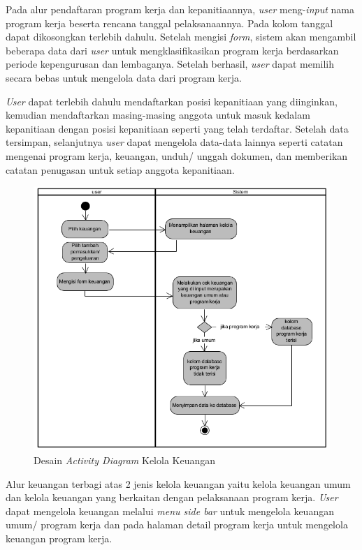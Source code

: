 Pada alur pendaftaran program kerja dan kepanitiaannya, \textit{user} meng-\textit{input} nama program kerja beserta rencana tanggal pelaksanaannya. Pada kolom tanggal dapat dikosongkan terlebih dahulu. Setelah mengisi \textit{form}, sistem akan mengambil beberapa data dari \textit{user} untuk mengklasifikasikan program kerja berdasarkan periode kepengurusan dan lembaganya. Setelah berhasil, \textit{user} dapat memilih secara bebas untuk mengelola data dari program kerja. 

\textit{User} dapat terlebih dahulu mendaftarkan posisi kepanitiaan yang diinginkan, kemudian mendaftarkan masing-masing anggota untuk masuk kedalam kepanitiaan dengan posisi kepanitiaan seperti yang telah terdaftar. Setelah data tersimpan, selanjutnya \textit{user} dapat mengelola data-data lainnya seperti catatan mengenai program kerja, keuangan, unduh/ unggah dokumen, dan memberikan catatan penugasan untuk setiap anggota kepanitiaan. 

\begin{figure}[H]
	\centering
	\includegraphics[width=1.0\textwidth]{gambar/Activitykeuangan}
	\caption{Desain \textit{Activity Diagram} Kelola Keuangan}
	\label{ActivityKeuangan_diagram}
\end{figure}

Alur keuangan terbagi atas 2 jenis kelola keuangan yaitu kelola keuangan umum dan kelola keuangan yang berkaitan dengan pelaksanaan program kerja. \textit{User} dapat mengelola keuangan melalui \textit{menu side bar} untuk mengelola keuangan umum/ program kerja dan pada halaman detail program kerja untuk mengelola keuangan program kerja.

